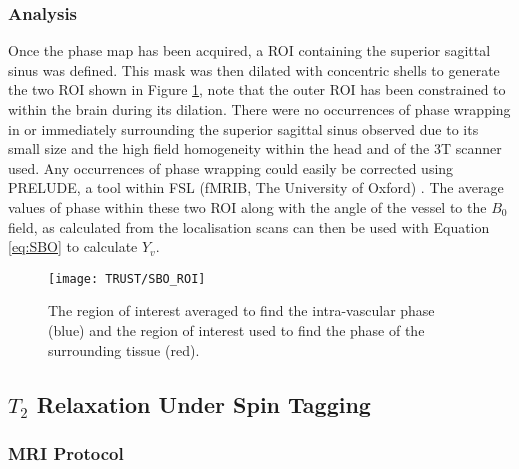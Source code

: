 \subsubsection{Analysis}

Once the phase map has been acquired, a \ac{ROI} containing the superior sagittal sinus was defined. This mask was then dilated with concentric shells to generate the two \ac{ROI} shown in Figure \ref{fig:SBO_ROI}, note that the outer \ac{ROI} has been constrained to within the brain during its dilation. There were no occurrences of phase wrapping in or immediately surrounding the superior sagittal sinus observed due to its small size and the high field homogeneity within the head and of the 3T scanner used. Any occurrences of phase wrapping could easily be corrected using \ac{PRELUDE}, a tool within \ac{FSL} (fMRIB, The University of Oxford) \cite{jenkinson_fast_2003}. The average values of phase within these two \ac{ROI} along with the angle of the vessel to the $B_0$ field, as calculated from the localisation scans can then be used with Equation \eqref{eq:SBO} to calculate $Y_v$.\\

\begin{figure}[H]
	\centering
	\texttt{[image: TRUST/SBO\_ROI]}
	\caption{The region of interest averaged to find the intra-vascular phase (blue) and the region of interest used to find the phase of the surrounding tissue (red).}
	\label{fig:SBO_ROI}	
\end{figure}


\subsection{$T_2$ Relaxation Under Spin Tagging}

\subsubsection{\ac{MRI} Protocol}
\label{sec:TRUST_MRI}

